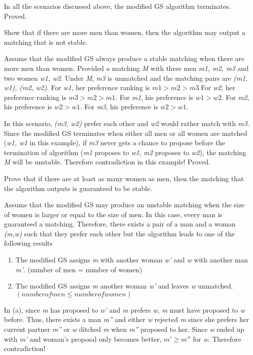 \documentclass{homework}
\begin{document}
\begin{enumerate}
    In all the scenarios discussed above, the modified GS algorithm terminates. Proved.
    
    
    \question Show that if there are more men than women, then the algorithm may output a matching that is not stable.
    
    Assume that the modified GS always produce a stable matching when there are more men than women. Provided a matching \textit{M} with three men \textit{m1, m2, m3} and two women \textit{w1, w2}. Under \textit{M}, \textit{m3} is unmatched and the matching pairs are \textit{(m1, w1), (m2, w2)}.  For \textit{w1}, her preference ranking is \textit{$m1 > m2 > m3$}.For \textit{w2}, her preference ranking is \textit{$m3 > m2 > m1$}. For \textit{m1}, his preference is \textit{$w1 > w2$}. For \textit{m2}, his preference is \textit{$w2 > w1$}. For \textit{m3}, his preference is \textit{$w2 > w1$}.
    
    In this scenario, \textit{(m3, w2)} prefer each other and \textit{w2} would rather match with \textit{m3}. Since the modified GS terminates when either all men or all women are matched (\textit{w1, w1} in this example), if \textit{m3} never gets a chance to propose before the termination of algorithm (\textit{m1} proposes to \textit{w1}, \textit{m2} proposes to \textit{w2}), the matching \textit{M} will be unstable. Therefore contradiction in this example! Proved.
    
    \question Prove that if there are at least as many women as men, then the matching that the algorithm outputs is guaranteed to be stable.
    
    Assume that the modified GS may produce an unstable matching when the size of women is larger or equal to the size of men. In this case, every man is guaranteed a matching. Therefore, there exists a pair of a man and a woman \textit{(m,w)} such that they prefer each other but the algorithm leads to one of the following results
    \begin{enumerate}
        \item The modified GS assigns \textit{m} with another woman \textit{w'} and \textit{w} with another man \textit{m'}. (number of men = number of women)
        \item The modified GS assigns \textit{m} another woman \textit{w'} and leaves \textit{w} unmatched. $(number of men \leq number of women)$
    \end{enumerate}
    
    In (a), since \textit{m} has proposed to \textit{w'} and \textit{m} prefers \textit{w}, \textit{m} must have proposed to \textit{w} before. Thus, there exists a man \textit{m''} and either \textit{w} rejected \textit{m} since she prefers her current partner \textit{m''} or \textit{w} ditched \textit{m} when \textit{m''} proposed to her. Since \textit{w} ended up with \textit{m'} and woman's proposal only becomes better, \textit{$m' \geq m''$} for \textit{w}. Therefore contradiction!
    

\end{enumerate}
\end{document}

